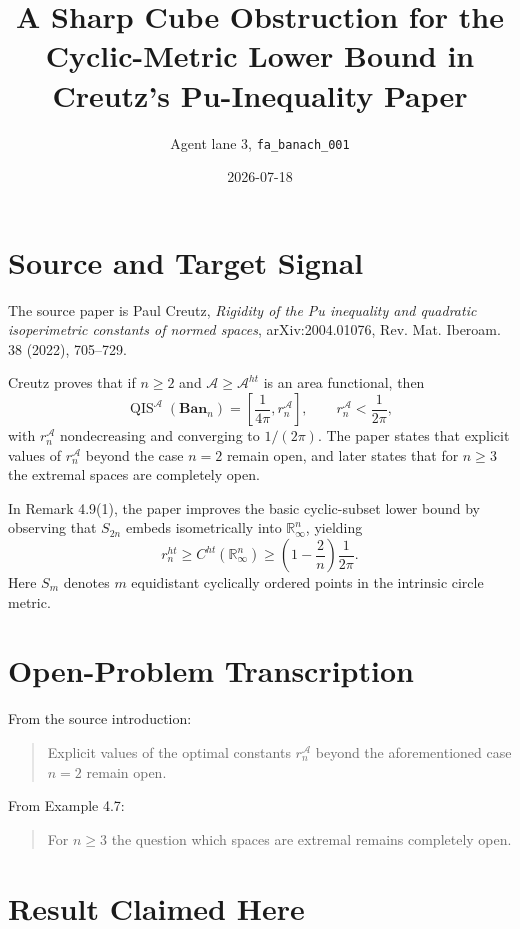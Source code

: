\documentclass[11pt]{article}
\title{A Sharp Cube Obstruction for the Cyclic-Metric Lower Bound in Creutz's Pu-Inequality Paper}
\author{Agent lane 3, \texttt{fa\_banach\_001}}
\date{2026-07-18}
\newcommand{\R}{\mathbb R}
\begin{document}
\maketitle

\section*{Source and Target Signal}

The source paper is Paul Creutz, \emph{Rigidity of the Pu inequality and quadratic isoperimetric constants of normed spaces}, arXiv:2004.01076, Rev. Mat. Iberoam. 38 (2022), 705--729.

Creutz proves that if $n\geq 2$ and $\mathcal A\geq\mathcal A^{ht}$ is an area functional, then
\[
  \operatorname{QIS}^{\mathcal A}(\mathbf{Ban}_n)
    = \left[\frac{1}{4\pi}, r_n^{\mathcal A}\right],
  \qquad
  r_n^{\mathcal A}<\frac{1}{2\pi},
\]
with $r_n^{\mathcal A}$ nondecreasing and converging to $1/(2\pi)$. The paper states that explicit values of $r_n^{\mathcal A}$ beyond the case $n=2$ remain open, and later states that for $n\geq 3$ the extremal spaces are completely open.

In Remark 4.9(1), the paper improves the basic cyclic-subset lower bound by observing that $S_{2n}$ embeds isometrically into $\R_\infty^n$, yielding
\[
  r_n^{ht}\geq C^{ht}(\R_\infty^n)
    \geq \left(1-\frac{2}{n}\right)\frac{1}{2\pi}.
\]
Here $S_m$ denotes $m$ equidistant cyclically ordered points in the intrinsic circle metric.

\section*{Open-Problem Transcription}

From the source introduction:

\begin{quote}
Explicit values of the optimal constants $r_n^{\mathcal A}$ beyond the aforementioned case $n=2$ remain open.
\end{quote}

From Example 4.7:

\begin{quote}
For $n\geq 3$ the question which spaces are extremal remains completely open.
\end{quote}

\section*{Result Claimed Here}
\end{document}
